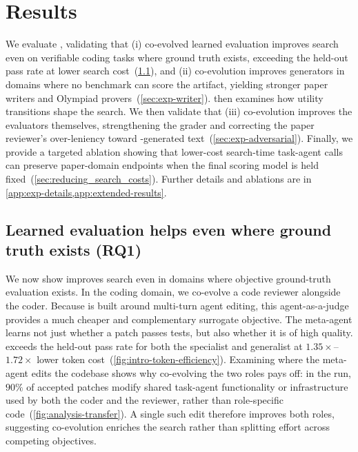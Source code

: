 \section{Results}
\label{sec:experiments}


We evaluate \ourmethod, validating that (i) co-evolved learned evaluation improves search even on verifiable coding tasks where ground truth exists, exceeding the \hgmh held-out pass rate at lower search cost~(\cref{sec:exp-polyglot}), and (ii) co-evolution improves generators in domains where no benchmark can score the artifact, yielding stronger paper writers and Olympiad provers~(\cref{sec:exp-writer}).  then examines how utility transitions shape the search. We then validate that (iii) co-evolution improves the evaluators themselves, strengthening the grader and correcting the paper reviewer's over-leniency toward \AI-generated text~(\cref{sec:exp-adversarial}). Finally, we provide a targeted ablation showing that lower-cost search-time task-agent calls can preserve paper-domain endpoints when the final scoring model is held fixed~(\cref{sec:reducing_search_costs}). Further details and ablations are in \cref{app:exp-details,app:extended-results}.



\subsection{Learned evaluation helps even where ground truth exists (RQ1)}
\label{sec:exp-polyglot}

We now show \ourmethod improves search even in domains where objective ground-truth evaluation exists. In the \polyglot coding domain, we co-evolve a code reviewer alongside the coder. Because \polyglot is built around multi-turn agent editing, this agent-as-a-judge provides a much cheaper and complementary surrogate objective. The meta-agent learns not just whether a patch passes tests, but also whether it is of high quality. \Theourmethod exceeds the \hgmh held-out pass rate for both the specialist and generalist at $1.35\times$--$1.72\times$ lower token cost~(\cref{fig:intro-token-efficiency}). Examining where the meta-agent edits the codebase shows why co-evolving the two roles pays off: in the \polyglot run, $90\%$ of accepted patches modify shared task-agent functionality or infrastructure used by both the coder and the reviewer, rather than role-specific code~(\cref{fig:analysis-transfer}). A single such edit therefore improves both roles, suggesting co-evolution enriches the search rather than splitting effort across competing objectives.


